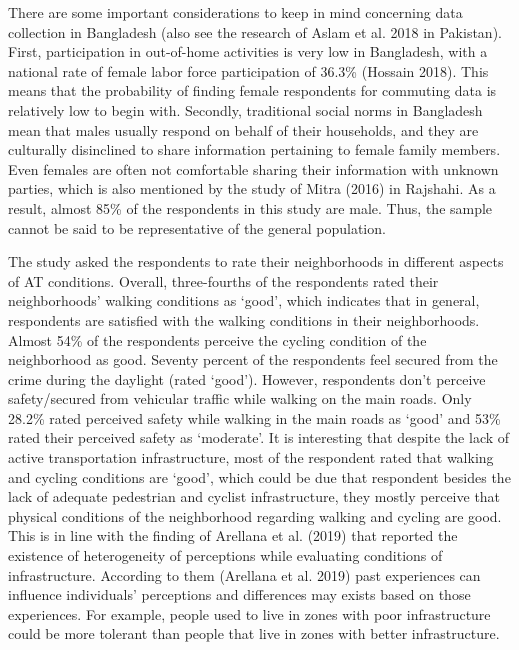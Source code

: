 \documentclass[]{elsarticle} %
\begin{document}
There are some important considerations to keep in mind concerning data
collection in Bangladesh (also see the research of Aslam et al. 2018 in
Pakistan). First, participation in out-of-home activities is very low in
Bangladesh, with a national rate of female labor force participation of
36.3\% (Hossain 2018). This means that the probability of finding female
respondents for commuting data is relatively low to begin with.
Secondly, traditional social norms in Bangladesh mean that males usually
respond on behalf of their households, and they are culturally
disinclined to share information pertaining to female family members.
Even females are often not comfortable sharing their information with
unknown parties, which is also mentioned by the study of Mitra (2016) in
Rajshahi. As a result, almost 85\% of the respondents in this study are
male. Thus, the sample cannot be said to be representative of the
general population.

The study asked the respondents to rate their neighborhoods in different
aspects of AT conditions. Overall, three-fourths of the respondents
rated their neighborhoods' walking conditions as `good', which indicates
that in general, respondents are satisfied with the walking conditions
in their neighborhoods. Almost 54\% of the respondents perceive the
cycling condition of the neighborhood as good. Seventy percent of the
respondents feel secured from the crime during the daylight (rated
`good'). However, respondents don't perceive safety/secured from
vehicular traffic while walking on the main roads. Only 28.2\% rated
perceived safety while walking in the main roads as `good' and 53\%
rated their perceived safety as `moderate'. It is interesting that
despite the lack of active transportation infrastructure, most of the
respondent rated that walking and cycling conditions are `good', which
could be due that respondent besides the lack of adequate pedestrian and
cyclist infrastructure, they mostly perceive that physical conditions of
the neighborhood regarding walking and cycling are good. This is in line
with the finding of Arellana et al. (2019) that reported the existence
of heterogeneity of perceptions while evaluating conditions of
infrastructure. According to them (Arellana et al. 2019) past
experiences can influence individuals' perceptions and differences may
exists based on those experiences. For example, people used to live in
zones with poor infrastructure could be more tolerant than people that
live in zones with better infrastructure.
\end{document}
